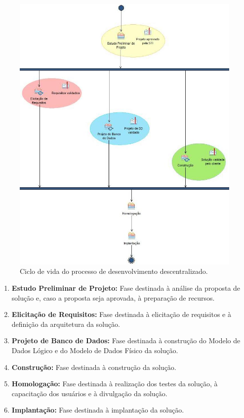 \begin{figure}[h]
	\centering
		\includegraphics[scale=0.8]{figuras/PDESC}
	\caption{Ciclo de vida do processo de desenvolvimento descentralizado.}
	\label{ciclo_vida_pdesc}
\end{figure}

\begin{enumerate}
	\item \textbf{Estudo Preliminar de Projeto:} Fase destinada à análise da proposta de solução e, caso a proposta seja aprovada, à preparação de recursos.
	\item \textbf{Elicitação de Requisitos:} Fase destinada à elicitação de requisitos e à definição da arquitetura da solução.
	\item \textbf{Projeto de Banco de Dados:} Fase destinada à construção do Modelo de Dados Lógico e do Modelo de Dados Físico da solução.
	\item \textbf{Construção:} Fase destinada à construção da solução.
	\item \textbf{Homologação:} Fase destinada à realização dos testes da solução, à capacitação dos usuários e à divulgação da solução.
	\item \textbf{Implantação:} Fase destinada à implantação da solução.
\end{enumerate}
\clearpage


